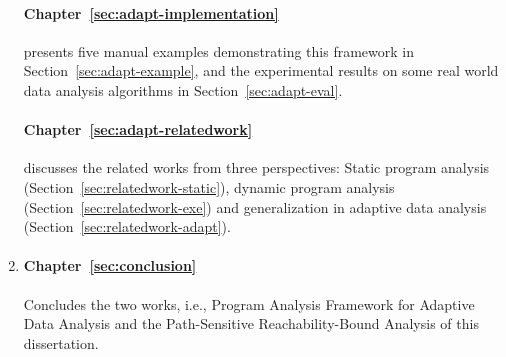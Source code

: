 \begin{enumerate}
    \paragraph{Chapter~\ref{sec:adapt-implementation}} presents five manual examples demonstrating this framework in Section~\ref{sec:adapt-example},
    and the experimental results on some real world data analysis algorithms in Section~\ref{sec:adapt-eval}.
    
    \paragraph{Chapter~\ref{sec:adapt-relatedwork}} discusses the related works from three perspectives:
    Static program analysis (Section~\ref{sec:relatedwork-static}), dynamic program analysis (Section~\ref{sec:relatedwork-exe}) and generalization in adaptive data analysis (Section~\ref{sec:relatedwork-adapt}).  

    \item {}
    \paragraph*{Chapter~\ref{sec:conclusion}}
    Concludes the two works, i.e., Program Analysis Framework for Adaptive Data Analysis
    and the Path-Sensitive Reachability-Bound Analysis of this dissertation.


\end{enumerate}

